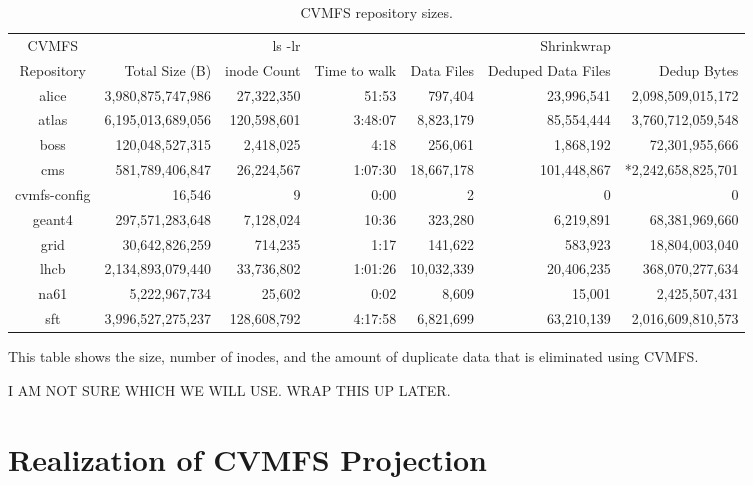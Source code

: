\documentclass[sigconf]{acmart}
\begin{document}
\begin{table}[t]
\begin{center}
\begin{tabular}{|c|r r r|r r r|}
\hline
CVMFS & & ls -lr & & & Shrinkwrap & \\
Repository & Total Size (B) & inode Count & Time to walk & 
  Data Files & Deduped Data Files & Dedup Bytes \\ \hline
alice & 3,980,875,747,986 & 27,322,350 & 51:53 & 
  797,404 & 23,996,541 & 2,098,509,015,172\\
atlas & 6,195,013,689,056 & 120,598,601 & 3:48:07 &
 8,823,179 & 85,554,444 & 3,760,712,059,548 \\
boss & 120,048,527,315 & 2,418,025 & 4:18 &
 256,061 & 1,868,192 & 72,301,955,666\\
cms & 581,789,406,847 & 26,224,567 & 1:07:30 &
 18,667,178 & 101,448,867 & *2,242,658,825,701\\
cvmfs-config & 16,546 & 9 & 0:00 &
 2 & 0 & 0 \\
geant4 & 297,571,283,648 & 7,128,024 & 10:36 &
 323,280 & 6,219,891 & 68,381,969,660 \\
grid & 30,642,826,259 & 714,235 & 1:17 &
 141,622 & 583,923 & 18,804,003,040 \\
lhcb & 2,134,893,079,440 & 33,736,802 & 1:01:26 &
 10,032,339 & 20,406,235 & 368,070,277,634 \\
na61 & 5,222,967,734 & 25,602 & 0:02 &
 8,609 & 15,001 & 2,425,507,431 \\
sft & 3,996,527,275,237 & 128,608,792 & 4:17:58 &
 6,821,699 & 63,210,139 & 2,016,609,810,573 \\ 
 \hline
\end{tabular}
\caption{CVMFS repository sizes.}
\label{tab:repo-sizes}
This table shows the size, number of inodes, and the amount
of duplicate data that is eliminated using CVMFS.
\end{center}
\end{table}

I AM NOT SURE WHICH WE WILL USE. WRAP THIS UP LATER.
\fi

\section{Realization of CVMFS Projection}
\end{document}
